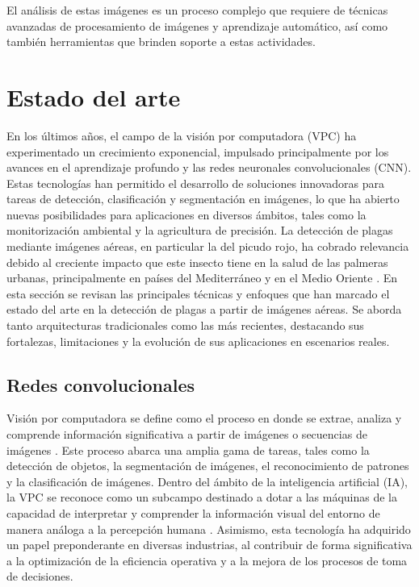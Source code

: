 
El análisis de estas imágenes es un proceso complejo que requiere de técnicas avanzadas de procesamiento de imágenes y aprendizaje automático, así como también herramientas que brinden soporte a estas actividades.

\section{Estado del arte}
\label{sec:estadoArte}

En los últimos años, el campo de la visión por computadora (VPC) ha experimentado un crecimiento exponencial, impulsado principalmente por los avances en el aprendizaje profundo y las redes neuronales convolucionales (CNN). Estas tecnologías han permitido el desarrollo de soluciones innovadoras para tareas de detección, clasificación y segmentación en imágenes, lo que ha abierto nuevas posibilidades para aplicaciones en diversos ámbitos, tales como la monitorización ambiental y la agricultura de precisión. La detección de plagas mediante imágenes aéreas, en particular la del picudo rojo, ha cobrado relevancia debido al creciente impacto que este insecto tiene en la salud de las palmeras urbanas, principalmente en países del Mediterráneo y en el Medio Oriente \citep{poplin_palm_2014}.
En esta sección se revisan las principales técnicas y enfoques que han marcado el estado del arte en la detección de plagas a partir de imágenes aéreas. Se aborda tanto arquitecturas tradicionales como las más recientes, destacando sus fortalezas, limitaciones y la evolución de sus aplicaciones en escenarios reales.

\subsection{Redes convolucionales}
\label{sec:redesConvolucionales}

Visión por computadora se define como el proceso en donde se extrae, analiza y comprende información significativa a partir de imágenes o secuencias de imágenes \citep{bmva_what_2017}. Este proceso abarca una amplia gama de tareas, tales como la detección de objetos, la segmentación de imágenes, el reconocimiento de patrones y la clasificación de imágenes. Dentro del ámbito de la inteligencia artificial (IA), la VPC se reconoce como un subcampo destinado a dotar a las máquinas de la capacidad de interpretar y comprender la información visual del entorno de manera análoga a la percepción humana \citep{torralba_foundations_2024}. Asimismo, esta tecnología ha adquirido un papel preponderante en diversas industrias, al contribuir de forma significativa a la optimización de la eficiencia operativa y a la mejora de los procesos de toma de decisiones.

